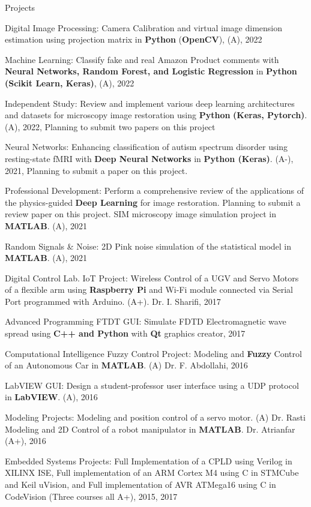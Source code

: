 \begin{cventries}
  \cventry
    {} %
    {Projects} %
    {} %
    {} %
    {
      \begin{cvitems} %
        \item{Digital Image Processing: Camera Calibration and virtual image dimension estimation using projection matrix in \textbf{Python} (\textbf{OpenCV}), (A), 2022}
            \item{Machine Learning: Classify fake and real Amazon Product comments with \textbf{Neural Networks, Random Forest, and Logistic Regression} in \textbf{Python} \textbf{(Scikit Learn, Keras)}, (A), 2022}
            \item{Independent Study:  Review and implement various deep learning architectures and datasets for microscopy image restoration using \textbf{Python} \textbf{(Keras, Pytorch)}. (A), 2022, Planning to submit two papers on this project}
            \item{Neural Networks: Enhancing classification of autism spectrum disorder using resting-state fMRI with \textbf{Deep Neural Networks} in \textbf{Python (Keras)}. (A-), 2021, Planning to submit a paper on this project.}
            \item{Professional Development: Perform a comprehensive review of the applications of the physics-guided \textbf{Deep Learning} for image restoration. Planning to submit a review paper on this project. SIM microscopy image simulation project in \textbf{MATLAB}. (A), 2021}
            \item{Random Signals \& Noise: 2D Pink noise simulation of the statistical model in \textbf{MATLAB}. (A), 2021}
            \item{Digital Control Lab. IoT Project: Wireless Control of a UGV and Servo Motors of a flexible arm using \textbf{Raspberry Pi} and Wi-Fi module connected via Serial Port programmed with Arduino. (A+). Dr. I. Sharifi, 2017}
            \item{Advanced Programming FTDT GUI: Simulate FDTD Electromagnetic wave spread using \textbf{C++ and Python} with \textbf{Qt} graphics creator, 2017}
            \item{Computational Intelligence Fuzzy Control Project: Modeling and \textbf{Fuzzy} Control of an Autonomous Car in \textbf{MATLAB}. (A) Dr. F. Abdollahi, 2016}
            \item{LabVIEW GUI: Design a student-professor user interface using a UDP protocol in \textbf{LabVIEW}. (A), 2016}
            \item{Modeling Projects: Modeling and position control of a servo motor. (A) Dr. Rasti\\ Modeling and 2D Control of a robot manipulator in \textbf{MATLAB}. Dr. Atrianfar (A+), 2016}
            \item{Embedded Systems Projects: Full Implementation of a CPLD using Verilog in XILINX ISE, Full implementation of an ARM Cortex M4 using C in STMCube and Keil uVision, and Full implementation of  AVR ATMega16 using C in CodeVision (Three courses all A+), 2015, 2017}
      \end{cvitems}
    }
    

\end{cventries}
